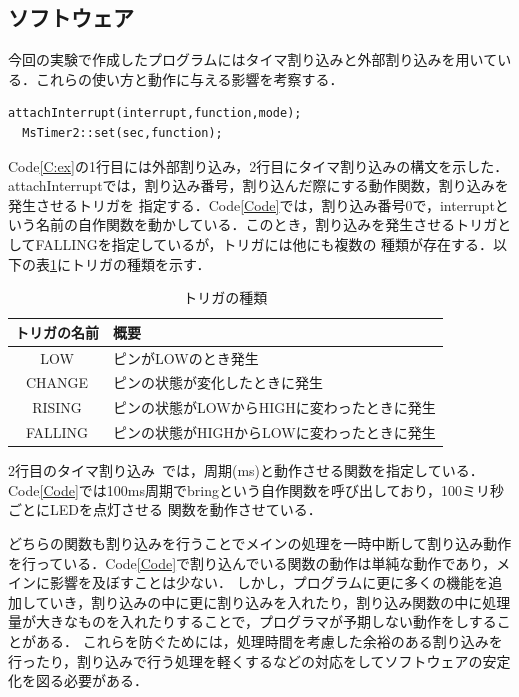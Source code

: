 \documentclass[a4paper,11pt]{jsarticle}
\begin{document}
\subsection{ソフトウェア}
今回の実験で作成したプログラムにはタイマ割り込みと外部割り込みを用いている．これらの使い方と動作に与える影響を考察する．
\begin{lstlisting}[caption=割り込みの使い方, label=C:ex]
  attachInterrupt(interrupt,function,mode);
  MsTimer2::set(sec,function);
\end{lstlisting}
Code\ref{C:ex}の1行目には外部割り込み，2行目にタイマ割り込みの構文を示した．attachInterruptでは，割り込み番号，割り込んだ際にする動作関数，割り込みを発生させるトリガを
指定する．Code\ref{Code}では，割り込み番号0で，interruptという名前の自作関数を動かしている．このとき，割り込みを発生させるトリガとしてFALLINGを指定しているが，トリガには他にも複数の
種類が存在する．以下の表\ref{T:TRIG}にトリガの種類を示す．~\cite{interrupt_fun}
\begin{table}[H]
  \begin{center}
    \caption{トリガの種類}
    \begin{tabular}{|c|l|} \hline
      トリガの名前 & 概要                                        \\ \hline
      LOW          & ピンがLOWのとき発生                         \\ \hline
      CHANGE       & ピンの状態が変化したときに発生              \\ \hline
      RISING       & ピンの状態がLOWからHIGHに変わったときに発生 \\ \hline
      FALLING      & ピンの状態がHIGHからLOWに変わったときに発生 \\ \hline
    \end{tabular}
    \label{T:TRIG}
  \end{center}
\end{table} \par
2行目のタイマ割り込み~\cite{interrupt2}では，周期(ms)と動作させる関数を指定している．Code\ref{Code}では100ms周期でbringという自作関数を呼び出しており，100ミリ秒ごとにLEDを点灯させる
関数を動作させている．\par
どちらの関数も割り込みを行うことでメインの処理を一時中断して割り込み動作を行っている．Code\ref{Code}で割り込んでいる関数の動作は単純な動作であり，メインに影響を及ぼすことは少ない．
しかし，プログラムに更に多くの機能を追加していき，割り込みの中に更に割り込みを入れたり，割り込み関数の中に処理量が大きなものを入れたりすることで，プログラマが予期しない動作をしすることがある．
これらを防ぐためには，処理時間を考慮した余裕のある割り込みを行ったり，割り込みで行う処理を軽くするなどの対応をしてソフトウェアの安定化を図る必要がある．
\end{document}
